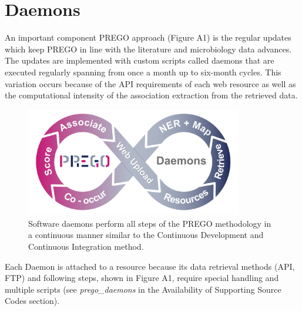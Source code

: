 \chapter{Daemons}
\label{app:B}

An important component PREGO approach (Figure A1) is the regular updates which keep PREGO in line with the literature and microbiology data advances. The updates are implemented with custom scripts called daemons that are executed regularly spanning from once a month up to six-month cycles. This variation occurs because of the API requirements of each web resource as well as the computational intensity of the association extraction from the retrieved data.

\begin{figure}[h]
   \centering
   \includegraphics[width=95mm]{figures/figure_A1_PREGO_daemons.png}
   \caption[PREGO DevOps]{Software daemons perform all steps of the PREGO methodology in a continuous manner similar to the Continuous Development and Continuous Integration method.}
   \label{fig:devops}
\end{figure}


Each Daemon is attached to a resource because its data retrieval methods (API, FTP) and following steps, shown in Figure A1, require special handling and multiple scripts (see \textit{prego\_daemons} in the Availability of Supporting Source Codes section).